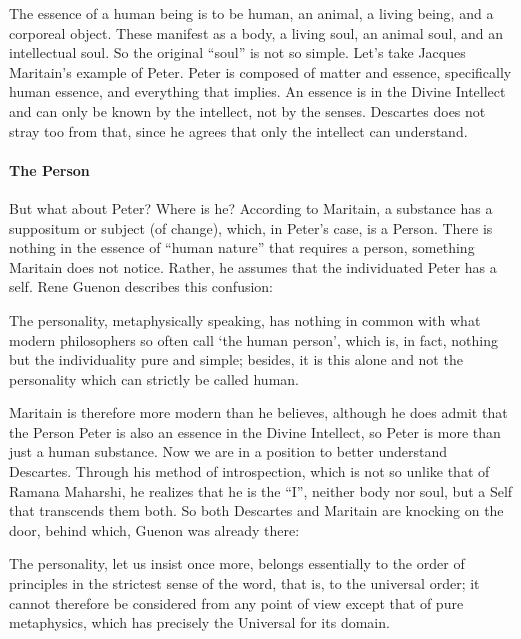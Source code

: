 The essence of a human being is to be human, an animal, a living being, and a corporeal object. These manifest as a body, a living soul, an animal soul, and an intellectual soul. So the original ``soul'' is not so simple. Let's take Jacques Maritain's example of Peter. Peter is composed of matter and essence, specifically human essence, and everything that implies. An essence is in the Divine Intellect and can only be known by the intellect, not by the senses. Descartes does not stray too from that, since he agrees that only the intellect can understand.

\paragraph{The Person}


But what about Peter? Where is he? According to Maritain, a substance has a suppositum or subject (of change), which, in Peter's case, is a Person. There is nothing in the essence of ``human nature'' that requires a person, something Maritain does not notice. Rather, he assumes that the individuated Peter has a self. Rene Guenon describes this confusion:

\begin{quotex}
The personality, metaphysically speaking, has nothing in common with what modern philosophers so often call `the human person', which is, in fact, nothing but the individuality pure and simple; besides, it is this alone and not the personality which can strictly be called human.
\end{quotex}


Maritain is therefore more modern than he believes, although he does admit that the Person Peter is also an essence in the Divine Intellect, so Peter is more than just a human substance. Now we are in a position to better understand Descartes. Through his method of introspection, which is not so unlike that of Ramana Maharshi, he realizes that he is the ``I'', neither body nor soul, but a Self that transcends them both. So both Descartes and Maritain are knocking on the door, behind which, Guenon was already there:

\begin{quotex}
The personality, let us insist once more, belongs essentially to the order of principles in the strictest sense of the word, that is, to the universal order; it cannot therefore be considered from any point of view except that of pure metaphysics, which has precisely the Universal for its domain.
\end{quotex}

